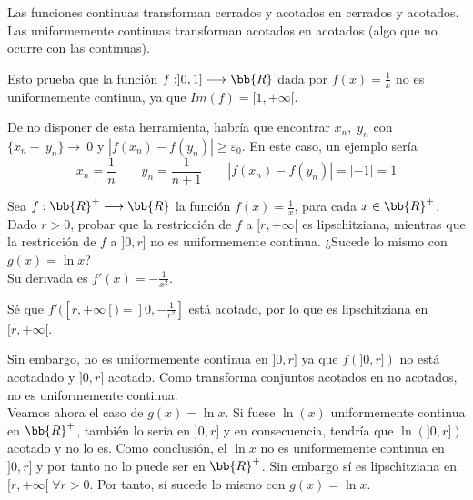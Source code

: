 \begin{ejercicio}
    \begin{observacion}
    Las funciones continuas transforman cerrados y acotados en cerrados y acotados. Las uniformemente continuas transforman acotados en acotados (algo que no ocurre con las continuas).

    Esto prueba que la función $f:]0, 1]\longrightarrow \bb{R}$ dada por $f(x)=\frac{1}{x}$ no es uniformemente continua, ya que $Im(f)=[1, +\infty[$.

    De no disponer de esta herramienta, habría que encontrar $x_n,\;y_n$ con $\{x_n-~y_n\} \to~0$ y $|f(x_n) - f(y_n)| \geq \varepsilon_0$. En este caso, un ejemplo sería
    $$x_n = \frac{1}{n} \qquad y_n = \frac{1}{n+1} \qquad |f(x_n) - f(y_n)| = |-1|=1$$
    \end{observacion}
\end{ejercicio}

\begin{ejercicio}
    Sea $f:\bb{R}^+\longrightarrow \bb{R}$ la función $f(x)=\frac{1}{x}$, para cada $x\in \bb{R}^+$. Dado $r > 0$, probar que la restricción de $f$ a $[r, +\infty[$ es lipschitziana, mientras que la restricción de $f$ a $]0, r]$ no es uniformemente continua. ¿Sucede lo mismo con $g(x)=\ln x$?\\

    Su derivada es $f'(x)=-\frac{1}{x^2}$.
    
    Sé que $f'([r, +\infty[)=]0,-\frac{1}{r^2}]$ está acotado, por lo que es lipschitziana en $[r, +\infty[$.
    
    Sin embargo, no es uniformemente continua en $]0, r]$ ya que $f(]0, r])$ no está acotadado y $]0, r]$ acotado. Como transforma conjuntos acotados en no acotados, no es uniformemente continua.\\


    Veamos ahora el caso de $g(x)=\ln x$. Si fuese $\ln(x)$ uniformemente continua en $\bb{R}^+$, también lo sería en $]0, r]$ y en consecuencia, tendría que $\ln(]0, r])$ acotado y no lo es. Como conclusión, el $\ln x$ no es uniformemente continua en $]0, r]$ y por tanto no lo puede ser en $\bb{R}^+$. Sin embargo sí es lipschitziana en $[r, +\infty[ \; \forall r>0$. Por tanto, sí sucede lo mismo con $g(x)=\ln x$.
\end{ejercicio}

